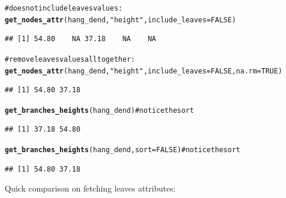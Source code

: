 \documentclass[shortnames,nojss,article]{jss}\usepackage{graphicx, color}
\makeatletter
\newcommand{\hlfunctioncall}[1]{\textcolor[rgb]{0.501960784313725,0,0.329411764705882}{\textbf{#1}}}%
\newcommand{\hlstring}[1]{\textcolor[rgb]{0.6,0.6,1}{#1}}%
\newcommand{\hlcomment}[1]{\textcolor[rgb]{0.180392156862745,0.6,0.341176470588235}{#1}}%
\newenvironment{kframe}{%
 \def\at@end@of@kframe{}%
 \ifinner\ifhmode%
  \def\at@end@of@kframe{\end{minipage}}%
  \begin{minipage}{\columnwidth}%
 \fi\fi%
 \def\FrameCommand##1{\hskip\@totalleftmargin \hskip-\fboxsep
 \colorbox{shadecolor}{##1}\hskip-\fboxsep
     \hskip-\linewidth \hskip-\@totalleftmargin \hskip\columnwidth}%
 \MakeFramed {\advance\hsize-\width
   \@totalleftmargin\z@ \linewidth\hsize
   \@setminipage}}%
 {\par\unskip\endMakeFramed%
 \at@end@of@kframe}
\newenvironment{knitrout}{}{} %
\makeatother
\begin{document}
\begin{knitrout}
\begin{kframe}
\begin{alltt}
\hlcomment{# does not include leaves values:}
\hlfunctioncall{get_nodes_attr}(hang_dend, \hlstring{"height"}, include_leaves = FALSE)
\end{alltt}
\begin{verbatim}
## [1] 54.80    NA 37.18    NA    NA
\end{verbatim}
\begin{alltt}
\hlcomment{# remove leaves values all together:}
\hlfunctioncall{get_nodes_attr}(hang_dend, \hlstring{"height"}, include_leaves = FALSE, na.rm = TRUE)
\end{alltt}
\begin{verbatim}
## [1] 54.80 37.18
\end{verbatim}
\begin{alltt}
\hlfunctioncall{get_branches_heights}(hang_dend)  \hlcomment{# notice the sort}
\end{alltt}
\begin{verbatim}
## [1] 37.18 54.80
\end{verbatim}
\begin{alltt}
\hlfunctioncall{get_branches_heights}(hang_dend, sort = FALSE)  \hlcomment{# notice the sort}
\end{alltt}
\begin{verbatim}
## [1] 54.80 37.18
\end{verbatim}
\begin{alltt}

\end{alltt}
\end{kframe}
\end{knitrout}



Quick comparison on fetching leaves attributes:
\end{document}
